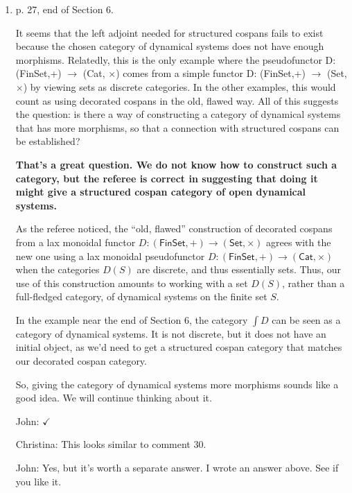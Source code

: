\documentclass[reqno]{amsart}
\def\chris{\color{purple} Christina: }
\def\john{\color{red} John: }
\begin{document}
\begin{enumerate}
{\john That sounds plausible.  Unless there's a damn good reason let's use $f$ as a map for vertices and $g$ as a map for edges, since ``vertices come 
before edges'' - morally the first are 0-cells, the second are 1-cells.}

{\chris I see. Fixed, and see above.}
\fi

\item p. 27, end of Section 6.

It seems that the left adjoint needed for structured cospans fails to exist because the chosen category of dynamical systems does not have enough 
morphisms. Relatedly, this is the only example where the pseudofunctor D: (FinSet,+) $\to$ (Cat, $\times$) comes from a simple functor D: (FinSet,+) 
$\to$ (Set, $\times$) by viewing sets as discrete categories. In the other examples, this would count as using decorated cospans in the old, flawed 
way. 
All of this suggests the question: is there a way of constructing a category of dynamical systems that has more morphisms, so that a connection with 
structured cospans can be established?

{\bf That's a great question.   We do not know how to construct such a category, but the referee
is correct in suggesting that doing it might give a structured cospan category of open dynamical
systems.    

As the referee noticed, the ``old, flawed'' construction of 
decorated cospans from a lax monoidal functor $D \colon (\mathsf{FinSet},+) \to 
(\mathsf{Set}, \times) $ agrees with the new one using a lax monoidal pseudofunctor  $D \colon (\mathsf{FinSet},+) \to (\mathsf{Cat}, \times) $ when 
the categories $D(S)$ are discrete,
and thus essentially sets.   Thus, our use of this construction amounts to working with a
set $D(S)$, rather than a full-fledged category, of dynamical systems on the finite set $S$.

In the example near the end of Section 6, the category $\int \! D$ can be seen as a category
of dynamical systems.   It is not discrete, but it does not have an initial object, as we'd
need to get a structured cospan
category that matches our decorated cospan category.   

So, giving the category of dynamical systems more morphisms sounds like a good idea. We will continue thinking about it.}  { \john $\checkmark$}

{\chris This looks similar to comment 30.}

{\john Yes, but it's worth a separate answer.   I wrote an answer above.  See if you like it.  }


\end{enumerate}
\end{document}
